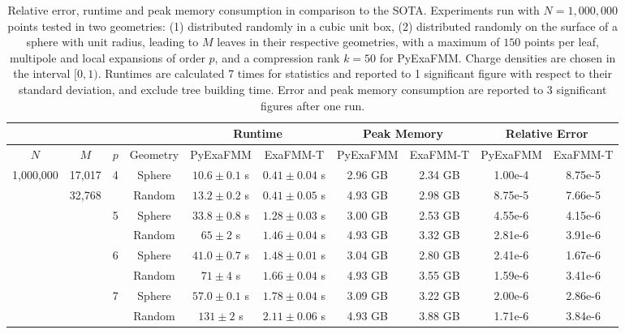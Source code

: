 \documentclass{IEEEcsmag}
\begin{document}
\begin{table}[t]
	\centering
	\caption{Relative error, runtime and peak memory consumption in comparison to the SOTA. Experiments run with $N=1,000,000$ points tested in two geometries: (1) distributed randomly in a cubic unit box, (2) distributed randomly on the surface of a sphere with unit radius, leading to $M$ leaves in their respective geometries, with a maximum of $150$ points per leaf, multipole and local expansions of order $p$, and a compression rank $k=50$ for PyExaFMM. Charge densities are chosen in the interval $[0, 1)$. Runtimes are calculated 7 times for statistics and reported to 1 significant figure with respect to their standard deviation, and exclude tree building time. Error and peak memory consumption are reported to 3 significant figures after one run.}
	\begin{tabular}{|*{10}{c|}}
		\hline
		& & &   & \multicolumn{2}{c|}{Runtime} & \multicolumn{2}{c|}{Peak Memory} & \multicolumn{2}{c|}{Relative Error}\\
		\hline
		$N$ & $M$ &$p$ &  Geometry   &   PyExaFMM  &  ExaFMM-T &    PyExaFMM  &  ExaFMM-T  &   PyExaFMM  &  ExaFMM-T\\
		\hline
		1,000,000 & 17,017 & 4   &   Sphere  &  $10.6 \pm 0.1$ s & $0.41 \pm 0.04$ s  &  2.96 GB  &   2.34 GB  & 1.00e-4 & 8.75e-5\\
		 & 32,768 &    &   Random  &  $13.2 \pm 0.2$ s &  $0.41 \pm 0.05$ s &  4.93 GB  &   2.98 GB  & 8.75e-5 & 7.66e-5\\
		&  & 5   &   Sphere  &    $33.8 \pm 0.8$ s & $1.28 \pm 0.03$ s &  3.00 GB  &  2.53 GB  & 4.55e-6 & 4.15e-6\\
		 &  &   &   Random  &  $65 \pm 2$ s &    $1.46 \pm 0.04$ s  &  4.93 GB  &   3.32 GB  & 2.81e-6 & 3.91e-6\\
		 &  & 6   &   Sphere  &  $41.0 \pm 0.7$ s &   $1.48 \pm 0.01$ s  &  3.04 GB  &   2.80 GB  & 2.41e-6 & 1.67e-6\\
		 &  &    &   Random  &  $71 \pm 4$ s &   $1.66 \pm 0.04$ s  &  4.93 GB  &   3.55 GB  & 1.59e-6 & 3.41e-6\\
		 &  & 7   &   Sphere  &  $57.0 \pm 0.1$ s &  $1.78 \pm 0.04$ s  &  3.09 GB  &   3.22 GB  & 2.00e-6 & 2.86e-6\\
		 &  &    &   Random  & $131 \pm 2$ s &   $2.11 \pm 0.06$ s  &  4.93 GB  &   3.88 GB  & 1.71e-6 & 3.84e-6\\
		\hline
	\end{tabular}
	\label{tab:performance}
 \end{table}
\end{document}
